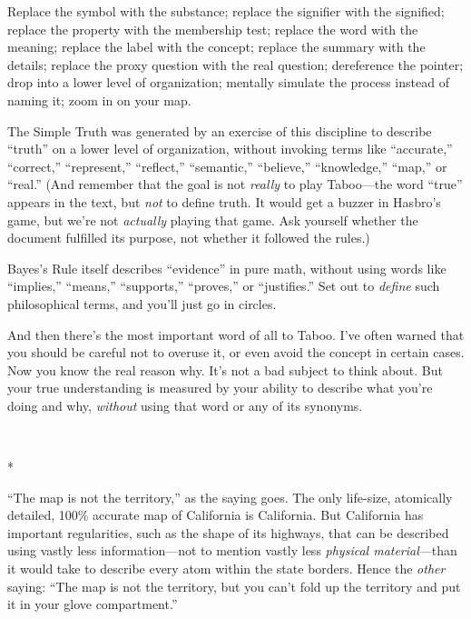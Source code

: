 {
 Replace the symbol with the substance; replace the signifier with
the signified; replace the property with the membership test; replace
the word with the meaning; replace the label with the concept; replace
the summary with the details; replace the proxy question with the real
question; dereference the pointer; drop into a lower level of
organization; mentally simulate the process instead of naming it; zoom
in on your map.}

{
 The Simple Truth was generated by an exercise of this discipline
to describe ``truth'' on a lower
level of organization, without invoking terms like
``accurate,''
``correct,''
``represent,''
``reflect,''
``semantic,''
``believe,''
``knowledge,''
``map,'' or
``real.'' (And remember that the
goal is not \textit{really} to play Taboo---the word
``true'' appears in the text, but
\textit{not} to define truth. It would get a buzzer in
Hasbro's game, but we're not
\textit{actually} playing that game. Ask yourself whether the document
fulfilled its purpose, not whether it followed the rules.)}

{
 Bayes's Rule itself describes
``evidence'' in pure math, without
using words like ``implies,''
``means,''
``supports,''
``proves,'' or
``justifies.'' Set out to
\textit{define} such philosophical terms, and you'll
just go in circles.}

{
 And then there's the most important word of all to
Taboo. I've often warned that you should be careful not
to overuse it, or even avoid the concept in certain cases. Now you know
the real reason why. It's not a bad subject to think
about. But your true understanding is measured by your ability to
describe what you're doing and why, \textit{without}
using that word or any of its synonyms.}

{\centering
 \ ~
\par}

{\centering
 *
\par}


{
 ``The map is not the
territory,'' as the saying goes. The only life-size,
atomically detailed, 100\% accurate map of California is California.
But California has important regularities, such as the shape of its
highways, that can be described using vastly less information---not to
mention vastly less \textit{physical material}{}---than it would take
to describe every atom within the state borders. Hence the
\textit{other} saying: ``The map is not the territory,
but you can't fold up the territory and put it in your
glove compartment.'' }


